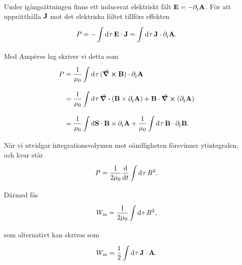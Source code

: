 Under igångsättningen finns ett inducerat elektriskt fält $\vb{E} = -\partial_{t}^{}\vb{A}$. För att upprätthålla $\vb{J}$ mot det elektriska fältet tillförs effekten
\begin{align*}
	P = -\int\limits_{}^{}\dd[]{\tau}\vb{E}\cdot\vb{J} = \int\limits_{}^{}\dd[]{\tau}\vb{J}\cdot\partial_{t}^{}\vb{A}.
\end{align*}
Med Ampères lag skriver vi detta som
\begin{align*}
	P &= \frac{1}{\mu_{0}}\int\limits_{}^{}\dd[]{\tau}(\curl{\vb{B}})\cdot\partial_{t}^{}\vb{A} \\
	  &= \frac{1}{\mu_{0}}\int\limits_{}^{}\dd[]{\tau}\div(\vb{B}\times\partial_{t}^{}\vb{A}) + \vb{B}\cdot\curl(\partial_{t}^{}\vb{A}) \\
	  &= \frac{1}{\mu_{0}}\int\limits_{}^{}\dd{\vb{S}}\cdot \vb{B}\times\partial_{t}^{}\vb{A} + \frac{1}{\mu_{0}}\int\limits_{}^{}\dd[]{\tau}\vb{B}\cdot\partial_{t}^{}\vb{B}.
\end{align*}
När vi utvidgar integrationsvolymen mot oändligheten försvinner ytintegralen, och kvar står
\begin{align*}
	P = \frac{1}{2\mu_{0}}\dv{t}\int\limits_{}^{}\dd[]{\tau}B^{2}.
\end{align*}
Därmed fås
\begin{align*}
	W_{\text{m}} = \frac{1}{2\mu_{0}}\int\limits_{}^{}\dd[]{\tau}B^{2},
\end{align*}
som alternativt kan skrivas som
\begin{align*}
	W_{\text{m}} = \frac{1}{2}\int\limits_{}^{}\dd[]{\tau}\vb{J}\cdot\vb{A}.
\end{align*}

